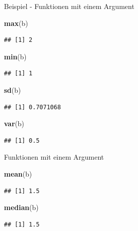 \documentclass[
  ignorenonframetext,
]{beamer}
\newenvironment{Shaded}{\begin{snugshade}}{\end{snugshade}}
\newcommand{\KeywordTok}[1]{\textcolor[rgb]{0.26,0.66,0.93}{\textbf{#1}}}
\newcommand{\NormalTok}[1]{\textcolor[rgb]{0.74,0.68,0.62}{#1}}
\begin{document}
\begin{frame}[fragile]{Beispiel - Funktionen mit einem Argument}
\protect\hypertarget{beispiel---funktionen-mit-einem-argument}{}

\begin{Shaded}
\begin{Highlighting}[]
\KeywordTok{max}\NormalTok{(b)}
\end{Highlighting}
\end{Shaded}

\begin{verbatim}
## [1] 2
\end{verbatim}

\begin{Shaded}
\begin{Highlighting}[]
\KeywordTok{min}\NormalTok{(b)}
\end{Highlighting}
\end{Shaded}

\begin{verbatim}
## [1] 1
\end{verbatim}

\begin{Shaded}
\begin{Highlighting}[]
\KeywordTok{sd}\NormalTok{(b)}
\end{Highlighting}
\end{Shaded}

\begin{verbatim}
## [1] 0.7071068
\end{verbatim}

\begin{Shaded}
\begin{Highlighting}[]
\KeywordTok{var}\NormalTok{(b)}
\end{Highlighting}
\end{Shaded}

\begin{verbatim}
## [1] 0.5
\end{verbatim}

\end{frame}

\begin{frame}[fragile]{Funktionen mit einem Argument}
\protect\hypertarget{funktionen-mit-einem-argument}{}

\begin{Shaded}
\begin{Highlighting}[]
\KeywordTok{mean}\NormalTok{(b)}
\end{Highlighting}
\end{Shaded}

\begin{verbatim}
## [1] 1.5
\end{verbatim}

\begin{Shaded}
\begin{Highlighting}[]
\KeywordTok{median}\NormalTok{(b)}
\end{Highlighting}
\end{Shaded}

\begin{verbatim}
## [1] 1.5
\end{verbatim}

\end{frame}
\end{document}
